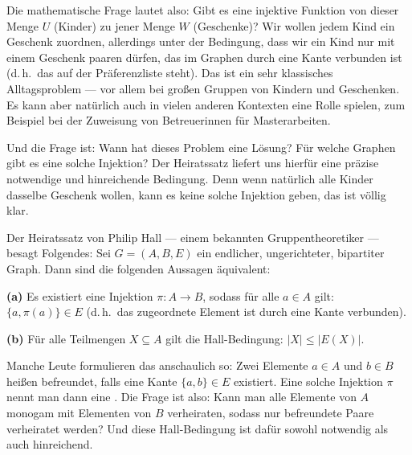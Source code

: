\begin{spoken-clean}[01:07:08 - 01:09:40]
Die mathematische Frage lautet also: Gibt es eine injektive Funktion von dieser Menge $U$ (Kinder) zu jener Menge $W$ (Geschenke)? Wir wollen jedem Kind ein Geschenk zuordnen, allerdings unter der Bedingung, dass wir ein Kind nur mit einem Geschenk paaren dürfen, das im Graphen durch eine Kante verbunden ist (d.\,h.\ das auf der Präferenzliste steht). Das ist ein sehr klassisches Alltagsproblem --- vor allem bei großen Gruppen von Kindern und Geschenken. Es kann aber natürlich auch in vielen anderen Kontexten eine Rolle spielen, zum Beispiel bei der Zuweisung von Betreuerinnen für Masterarbeiten.

Und die Frage ist: Wann hat dieses Problem eine Lösung? Für welche Graphen gibt es eine solche Injektion? Der Heiratssatz liefert uns hierfür eine präzise notwendige und hinreichende Bedingung. Denn wenn natürlich alle Kinder dasselbe Geschenk wollen, kann es keine solche Injektion geben, das ist völlig klar.
\end{spoken-clean}

\begin{ai-global-state-checkpoint-invisible-content}
\end{ai-global-state-checkpoint-invisible-content}

\begin{spoken-clean}[01:09:40 - 01:11:00]
Der Heiratssatz von Philip Hall --- einem bekannten Gruppentheoretiker --- besagt Folgendes: Sei $G = (A, B, E)$ ein endlicher, ungerichteter, bipartiter Graph. Dann sind die folgenden Aussagen äquivalent: 

\textbf{(a)} Es existiert eine Injektion $\pi \colon A \to B$, sodass für alle $a \in A$ gilt: $\{a, \pi(a)\} \in E$ (d.\,h.\ das zugeordnete Element ist durch eine Kante verbunden).

\textbf{(b)} Für alle Teilmengen $X \subseteq A$ gilt die Hall-Bedingung: $|X| \le |E(X)|$.

Manche Leute formulieren das anschaulich so: Zwei Elemente $a \in A$ und $b \in B$ heißen befreundet, falls eine Kante $\{a, b\} \in E$ existiert. Eine solche Injektion $\pi$ nennt man dann eine . Die Frage ist also: Kann man alle Elemente von $A$ monogam mit Elementen von $B$ verheiraten, sodass nur befreundete Paare verheiratet werden? Und diese Hall-Bedingung ist dafür sowohl notwendig als auch hinreichend.
\end{spoken-clean}


